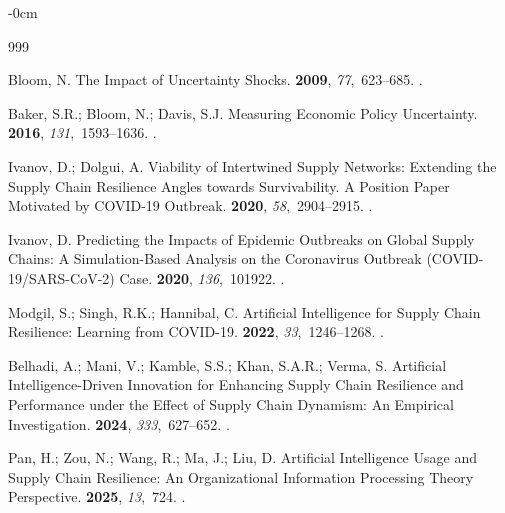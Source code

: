 \documentclass[systems,article,accept,moreauthors,pdftex]{Definitions/mdpi}
\begin{document}
\begin{adjustwidth}{-\extralength}{0cm}
{}
\begin{thebibliography}{999}

Bloom, N.
\newblock The Impact of Uncertainty Shocks.
 {\bf 2009}, {\em 77},~623--685.
.

Baker, S.R.; Bloom, N.; Davis, S.J.
\newblock Measuring Economic Policy Uncertainty.
 {\bf 2016}, {\em
  131},~1593--1636.
.

Ivanov, D.; Dolgui, A.
\newblock Viability of Intertwined Supply Networks: Extending the Supply Chain
  Resilience Angles towards Survivability. {A} Position Paper Motivated by
  {COVID-19} Outbreak.
 {\bf 2020}, {\em
  58},~2904--2915.
.

Ivanov, D.
\newblock Predicting the Impacts of Epidemic Outbreaks on Global Supply Chains:
  A Simulation-Based Analysis on the Coronavirus Outbreak
  ({COVID-19/SARS-CoV-2}) Case.
 {\bf 2020}, {\em 136},~101922.
.

Modgil, S.; Singh, R.K.; Hannibal, C.
\newblock Artificial Intelligence for Supply Chain Resilience: Learning from
  {COVID-19}.
 {\bf 2022},
  {\em 33},~1246--1268.
.

Belhadi, A.; Mani, V.; Kamble, S.S.; Khan, S.A.R.; Verma, S.
\newblock Artificial Intelligence-Driven Innovation for Enhancing Supply Chain
  Resilience and Performance under the Effect of Supply Chain Dynamism: An
  Empirical Investigation.
 {\bf 2024}, {\em 333},~627--652.
.

Pan, H.; Zou, N.; Wang, R.; Ma, J.; Liu, D.
\newblock Artificial Intelligence Usage and Supply Chain Resilience: An
  Organizational Information Processing Theory Perspective.
 {\bf 2025}, {\em 13},~724.
.


\end{thebibliography}
\end{adjustwidth}
\end{document}
